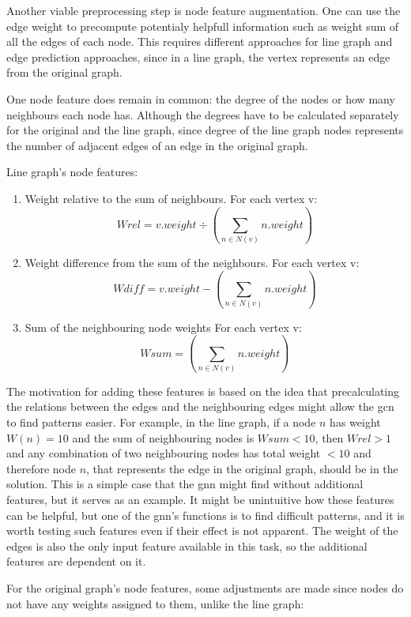 Another viable preprocessing step is node feature augmentation. One can use the edge weight to precompute potentialy helpfull information such as weight sum of all the edges of each node. This requires different approaches for line graph and edge prediction approaches, since in a line graph, the vertex represents an edge from the original graph.

One node feature does remain in common: the degree of the nodes or how many neighbours each node has. Although the degrees have to be calculated separately for the original and the line graph, since degree of the line graph nodes represents the number of adjacent edges of an edge in the original graph.

Line graph's node features:  

\begin{enumerate}
\item Weight relative to the sum of neighbours. For each vertex v:  \[ Wrel = v.weight  \div  (\sum_{n \in N(v)} n.weight) \]
\item Weight difference from the sum of the neighbours. For each vertex v:  \[ Wdiff = v.weight  -  (\sum_{n \in N(v)} n.weight) \]
\item Sum of the neighbouring node weights For each vertex v: \[ Wsum = (\sum_{n \in N(v)} n.weight) \]
\end{enumerate}

The motivation for adding these features is based on the idea that precalculating the relations between the edges and the neighbouring edges might allow the \gls{gcn} to find patterns easier. For example, in the line graph, if a node $n$ has weight $W(n) = 10$ and the sum of neighbouring nodes is $Wsum < 10$, then $Wrel > 1$ and any combination of two neighbouring nodes has total weight $< 10$ and therefore node $n$, that represents the edge in the original graph, should be in the solution. This is a simple case that the \gls{gnn} might find without additional features, but it serves as an example. It might be unintuitive how these features can be helpful, but one of the \gls{gnn}'s functions is to find difficult patterns, and it is worth testing such features even if their effect is not apparent. The weight of the edges is also the only input feature available in this task, so the additional features are dependent on it. 

For the original graph's node features, some adjustments are made since nodes do not have any weights assigned to them, unlike the line graph:

